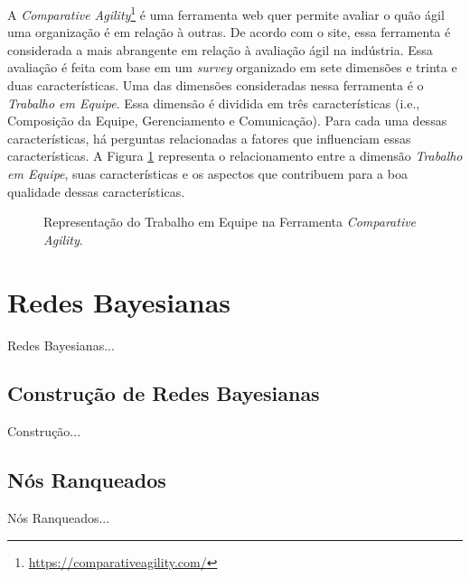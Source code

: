 A \textit{Comparative Agility}\footnote{\url{https://comparativeagility.com/}} é uma ferramenta web quer permite avaliar o quão ágil uma organização é em relação à outras. De acordo com o site, essa ferramenta é considerada a mais abrangente em relação à avaliação ágil na indústria. Essa avaliação é feita com base em um \textit{survey} organizado em sete dimensões e trinta e duas características. Uma das dimensões consideradas nessa ferramenta é o \textit{Trabalho em Equipe}. Essa dimensão é dividida em três características (i.e., Composição da Equipe, Gerenciamento e Comunicação). Para cada uma dessas características, há perguntas relacionadas a fatores que influenciam essas características. A Figura \ref{fundamentacao:ageis:fatores:comparativeagility} representa o relacionamento entre a dimensão \textit{Trabalho em Equipe}, suas características e os aspectos que contribuem para a boa qualidade dessas características.

\begin{figure}[ht!]
\begin{center}
    \end{center}
    \caption{Representação do Trabalho em Equipe na Ferramenta \textit{Comparative Agility}.}
    \label{fundamentacao:ageis:fatores:comparativeagility}
\end{figure}

\section{Redes Bayesianas}
\label{fundamentacao:redes}

{\color{red} Redes Bayesianas...}

\subsection{Construção de Redes Bayesianas}
\label{fundamentacao:redes:construcao}

{\color{red} Construção...}

\subsection{Nós Ranqueados}
\label{fundamentacao:nos}

{\color{red} Nós Ranqueados...}

